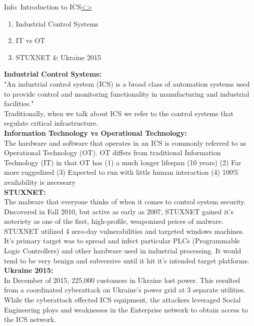 \documentclass[12pt]{extarticle}
\newenvironment{instructionblock}{\Large\bgroup}{\egroup}
\newcommand{\ben}{\begin{enumerate}}
\newcommand{\een}{\end{enumerate}}
\newcounter{next}
\newcounter{prev}
\begin{document}
\pagebreak
{}
\begin{slide}{Info: Introduction to ICS}{\hyperref[slide \theprev]{\textless}\hyperref[slide \thenext]{\textgreater}}
	\begin{instructionblock}
		\ben
			\item Industrial Control Systems
			\item IT vs OT
			\item STUXNET \& Ukraine 2015
		\een
	\end{instructionblock}
\end{slide}
\vfill
\noindent
\textbf{Industrial Control Systems:}\\
"An industrial control system (ICS) is a broad class of automation systems used to provide control and monitoring functionality in manufacturing and industrial facilities." \cite[p.13]{KnappLangill}\\
Traditionally, when we talk about ICS we refer to the control systems that regulate critical infrastructure.\\
\textbf{Information Technology vs Operational Technology:}\\
The hardware and software that operates in an ICS is commonly referred to as Operational Technology (OT). OT differs from traditional Information Technology (IT) in that OT has (1) a much longer lifespan (10 years) (2) Far more ruggedized (3) Expected to run with little human interaction (4) 100\% availability is necessary \cite{NexDef}\\
\textbf{STUXNET:}\\
The malware that everyone thinks of when it comes to control system security. Discovered in Fall 2010, but active as early as 2007, STUXNET gained it's noteriety as one of the first, high-profile, weaponized peices of malware. STUXNET utilized 4 zero-day vulnerabilities and targeted windows machines. It's primary target was to spread and infect particular PLCs (Programmable Logic Controllers) and other hardware used in industrial processing. It would tend to be very benign and subversive until it hit it's intended target platforms. \cite[p.191-192]{KnappLangill}\\
\textbf{Ukraine 2015:}\\
In December of 2015, 225,000 customers in Ukraine lost power. This resulted from a coordinated cyberattack on Ukraine's power grid at 3 separate utilities. While the cyberattack effected ICS equipment, the attackers leveraged Social Engineering ploys and weaknesses in the Enterprise network to obtain access to the ICS network. \cite{Ukraine2015}
\pagebreak
\end{document}
